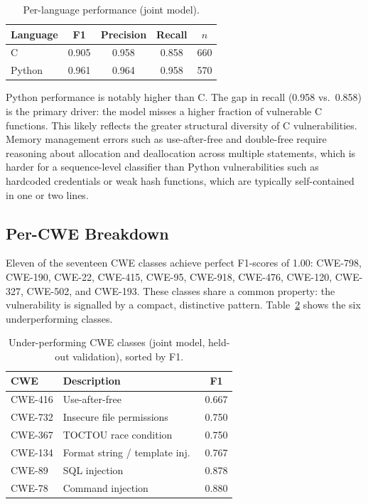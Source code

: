 \begin{table}[H]
  \centering
  \caption{Per-language performance (joint model).}
  \label{tab:exp1_language}
  \begin{tabular}{lcccc}
    \toprule
    Language & F1 & Precision & Recall & $n$ \\
    \midrule
    C      & 0.905 & 0.958 & 0.858 & 660 \\
    Python & 0.961 & 0.964 & 0.958 & 570 \\
    \bottomrule
  \end{tabular}
\end{table}

Python performance is notably higher than C.
The gap in recall (0.958 vs.\ 0.858) is the primary driver: the model misses a higher
fraction of vulnerable C functions.
This likely reflects the greater structural diversity of C vulnerabilities.
Memory management errors such as use-after-free and double-free require reasoning about
allocation and deallocation across multiple statements, which is harder for a sequence-level
classifier than Python vulnerabilities such as hardcoded credentials or weak hash functions,
which are typically self-contained in one or two lines.

\subsection{Per-CWE Breakdown}

Eleven of the seventeen CWE classes achieve perfect F1-scores of 1.00: CWE-798, CWE-190,
CWE-22, CWE-415, CWE-95, CWE-918, CWE-476, CWE-120, CWE-327, CWE-502, and CWE-193.
These classes share a common property: the vulnerability is signalled by a compact,
distinctive pattern.
Table~\ref{tab:exp1_cwe} shows the six underperforming classes.

\begin{table}[H]
  \centering
  \caption{Under-performing CWE classes (joint model, held-out validation), sorted by F1.}
  \label{tab:exp1_cwe}
  \begin{tabular}{llc}
    \toprule
    CWE & Description & F1 \\
    \midrule
    CWE-416 & Use-after-free              & 0.667 \\
    CWE-732 & Insecure file permissions   & 0.750 \\
    CWE-367 & TOCTOU race condition       & 0.750 \\
    CWE-134 & Format string / template inj.\ & 0.767 \\
    CWE-89  & SQL injection               & 0.878 \\
    CWE-78  & Command injection           & 0.880 \\
    \bottomrule
  \end{tabular}
\end{table}

